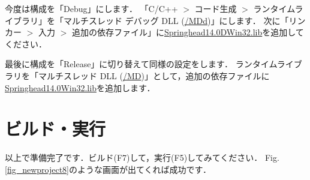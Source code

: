 \KLUDGE 今度は構成を「Debug\KLUDGE 」にします．
\KLUDGE 「C/C++ $>$ \KLUDGE コード生成 $>$ \KLUDGE ランタイムライブラリ」を「マルチスレッド \KLUDGE デバッグ DLL (\url{/MDd})\KLUDGE 」にします．
\KLUDGE 次に「リンカー $>$ \KLUDGE 入力 $>$ \KLUDGE 追加の依存ファイル」に\url{Springhead14.0DWin32.lib}\KLUDGE を追加してください．

\KLUDGE 最後に構成を「Release\KLUDGE 」に切り替えて同様の設定をします．
\KLUDGE ランタイムライブラリを「マルチスレッド DLL (\url{/MD})\KLUDGE 」として，追加の依存ファイルに\url{Springhead14.0Win32.lib}\KLUDGE を追加します．

\section*{\KLUDGE ビルド・実行}

\KLUDGE 以上で準備完了です．ビルド(F7)\KLUDGE して，実行(F5)\KLUDGE してみてください．
Fig.\,\ref{fig_newproject8}\KLUDGE のような画面が出てくれば成功です．

